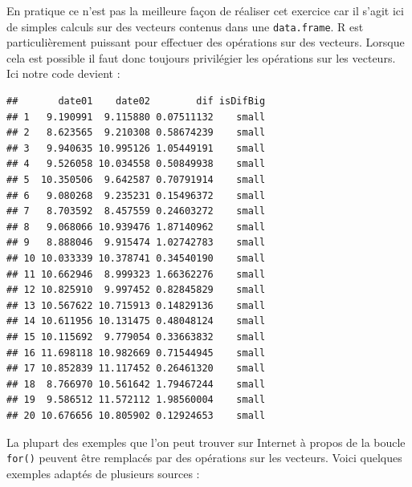 \documentclass[]{book}
\newenvironment{Shaded}{\begin{snugshade}}{\end{snugshade}}
\newcommand{\DataTypeTok}[1]{\textcolor[rgb]{0.13,0.29,0.53}{#1}}
\newcommand{\DecValTok}[1]{\textcolor[rgb]{0.00,0.00,0.81}{#1}}
\newcommand{\KeywordTok}[1]{\textcolor[rgb]{0.13,0.29,0.53}{\textbf{#1}}}
\newcommand{\NormalTok}[1]{#1}
\newcommand{\OperatorTok}[1]{\textcolor[rgb]{0.81,0.36,0.00}{\textbf{#1}}}
\newcommand{\StringTok}[1]{\textcolor[rgb]{0.31,0.60,0.02}{#1}}
\begin{document}
En pratique ce n'est pas la meilleure façon de réaliser cet exercice car il s'agit ici de simples calculs sur des vecteurs contenus dans une \texttt{data.frame}. R est particulièrement puissant pour effectuer des opérations sur des vecteurs. Lorsque cela est possible il faut donc toujours privilégier les opérations sur les vecteurs. Ici notre code devient :

\begin{Shaded}
\end{Shaded}

\begin{verbatim}
##       date01    date02        dif isDifBig
## 1   9.190991  9.115880 0.07511132    small
## 2   8.623565  9.210308 0.58674239    small
## 3   9.940635 10.995126 1.05449191    small
## 4   9.526058 10.034558 0.50849938    small
## 5  10.350506  9.642587 0.70791914    small
## 6   9.080268  9.235231 0.15496372    small
## 7   8.703592  8.457559 0.24603272    small
## 8   9.068066 10.939476 1.87140962    small
## 9   8.888046  9.915474 1.02742783    small
## 10 10.033339 10.378741 0.34540190    small
## 11 10.662946  8.999323 1.66362276    small
## 12 10.825910  9.997452 0.82845829    small
## 13 10.567622 10.715913 0.14829136    small
## 14 10.611956 10.131475 0.48048124    small
## 15 10.115692  9.779054 0.33663832    small
## 16 11.698118 10.982669 0.71544945    small
## 17 10.852839 11.117452 0.26461320    small
## 18  8.766970 10.561642 1.79467244    small
## 19  9.586512 11.572112 1.98560004    small
## 20 10.676656 10.805902 0.12924653    small
\end{verbatim}

La plupart des exemples que l'on peut trouver sur Internet à propos de la boucle \texttt{for()} peuvent être remplacés par des opérations sur les vecteurs. Voici quelques exemples adaptés de plusieurs sources :
\end{document}

